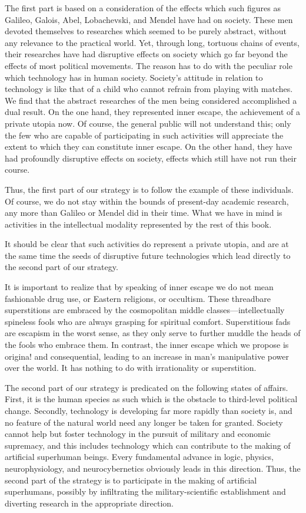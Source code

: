 \documentclass[10pt,twoside,draft]{memoir}
\begin{document}
{{{{The first part is based on a consideration of the effects which such 
figures as Galileo, Galois, Abel, Lobachevski, and Mendel have had on 
society. These men devoted themselves to researches which seemed to be 
purely abstract, without any relevance to the practical world. Yet, through 
long, tortuous chains of events, their researches have had disruptive effects 
on society which go far beyond the effects of most political movements. The 
reason has to do with the peculiar role which technology has in human 
society. Society's attitude in relation to technology is like that of a child 
who cannot refrain from playing with matches. We find that 
the abstract researches of the men being considered accomplished a dual 
result. On the one hand, they represented inner escape, the achievement of a 
private utopia now. Of course, the general public will not understand this; 
only the few who are capable of participating in such activities will 
appreciate the extent to which they can constitute inner escape. On the 
other hand, they have had profoundly disruptive effects on society, effects 
which still have not run their course. 

Thus, the first part of our strategy is to follow the example of these 
individuals. Of course, we do not stay within the bounds of present-day 
academic research, any more than Galileo or Mendel did in their time. What 
we have in mind is activities in the intellectual modality represented by the 
rest of this book. 

It should be clear that such activities do represent a private utopia, and are at 
the same time the seeds of disruptive future technologies which lead directly 
to the second part of our strategy. 

It is important to realize that by speaking of inner escape we do not 
mean fashionable drug use, or Eastern religions, or occultism. These 
threadbare superstitions are embraced by the cosmopolitan middle 
classes---intellectually spineless fools who are always grasping for spiritual 
comfort. Superstitious fads are escapism in the worst sense, as they only 
serve to further muddle the heads of the fools who embrace them. In 
contrast, the inner escape which we propose is origina! and consequential, 
leading to an increase in man's manipulative power over the world. It has 
nothing to do with irrationality or superstition. 

The second part of our strategy is predicated on the following states of 
affairs. First, it is the human species as such which is the obstacle to 
third-level political change. Secondly, technology is developing far more 
rapidly than society is, and no feature of the natural world need any longer 
be taken for granted. Society cannot help but foster technology in the 
pursuit of military and economic supremacy, and this includes technology 
which can contribute to the making of artificial superhuman beings. Every 
fundamental advance in logic, physics, neurophysiology, and 
neurocybernetics obviously leads in this direction. Thus, the second part of 
the strategy is to participate in the making of artificial superhumans, 
possibly by infiltrating the military-scientific establishment and diverting 
research in the appropriate direction. 

}}}}
\end{document}
